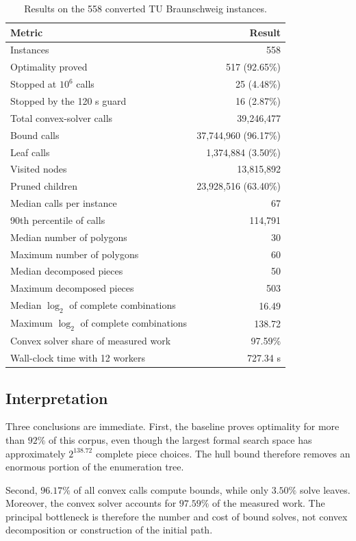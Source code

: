 \documentclass[11pt]{article}
\begin{document}
\begin{table}[ht]
\centering
\caption{Results on the 558 converted TU Braunschweig instances.}
\label{tab:results}
\begin{tabular}{lr}
\toprule
Metric & Result \\
\midrule
Instances & 558 \\
Optimality proved & 517 (92.65\%) \\
Stopped at $10^6$ calls & 25 (4.48\%) \\
Stopped by the 120 s guard & 16 (2.87\%) \\
Total convex-solver calls & 39,246,477 \\
Bound calls & 37,744,960 (96.17\%) \\
Leaf calls & 1,374,884 (3.50\%) \\
Visited nodes & 13,815,892 \\
Pruned children & 23,928,516 (63.40\%) \\
Median calls per instance & 67 \\
90th percentile of calls & 114,791 \\
Median number of polygons & 30 \\
Maximum number of polygons & 60 \\
Median decomposed pieces & 50 \\
Maximum decomposed pieces & 503 \\
Median $\log_2$ of complete combinations & 16.49 \\
Maximum $\log_2$ of complete combinations & 138.72 \\
Convex solver share of measured work & 97.59\% \\
Wall-clock time with 12 workers & 727.34 s \\
\bottomrule
\end{tabular}
\end{table}

\subsection{Interpretation}

Three conclusions are immediate. First, the baseline proves optimality for
more than $92\%$ of this corpus, even though the largest formal search space
has approximately $2^{138.72}$ complete piece choices. The hull bound therefore
removes an enormous portion of the enumeration tree.

Second, $96.17\%$ of all convex calls compute bounds, while only $3.50\%$
solve leaves. Moreover, the convex solver accounts for $97.59\%$ of the
measured work. The principal bottleneck is therefore the number and cost of
bound solves, not convex decomposition or construction of the initial path.
\end{document}
